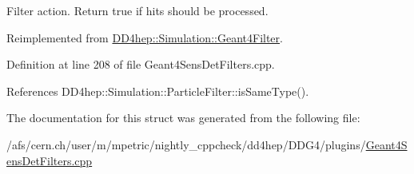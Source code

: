 Filter action. Return true if hits should be processed. 



Reimplemented from \hyperlink{class_d_d4hep_1_1_simulation_1_1_geant4_filter_a373f84ddcbefe180daa058050b6cf753}{D\+D4hep\+::\+Simulation\+::\+Geant4\+Filter}.



Definition at line 208 of file Geant4\+Sens\+Det\+Filters.\+cpp.



References D\+D4hep\+::\+Simulation\+::\+Particle\+Filter\+::is\+Same\+Type().



The documentation for this struct was generated from the following file\+:\begin{DoxyCompactItemize}
\item 
/afs/cern.\+ch/user/m/mpetric/nightly\+\_\+cppcheck/dd4hep/\+D\+D\+G4/plugins/\hyperlink{_geant4_sens_det_filters_8cpp}{Geant4\+Sens\+Det\+Filters.\+cpp}\end{DoxyCompactItemize}
